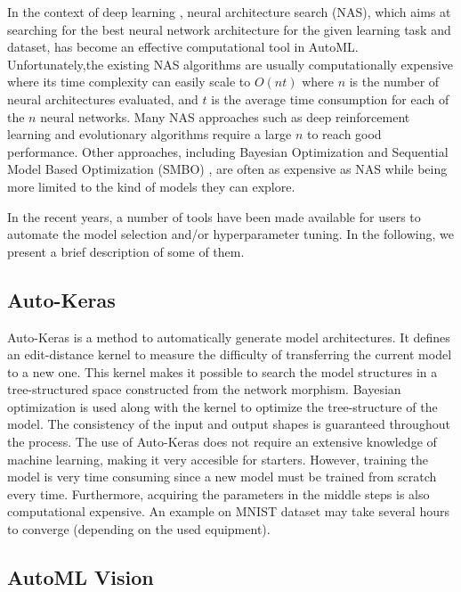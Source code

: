 \documentclass[12pt]{elsart}%
\begin{document}
In the context of deep learning , neural architecture search (NAS), which aims at searching for the best neural network architecture for the given learning task and dataset, has become an effective computational tool in AutoML. Unfortunately,the existing NAS algorithms are usually computationally expensive where its time complexity can easily scale to $O(nt)$ where $n$ is the number of neural architectures evaluated, and $t$ is the average time consumption for each of the $n$ neural networks. Many NAS approaches such as deep reinforcement learning  \cite{Zoph2016,Baker2016,Zhong2017} and evolutionary algorithms \cite{Liu2018,Liang2017,Angeline1994,Suganuma2017} require a large $n$ to reach good performance. Other approaches, including Bayesian Optimization \cite{Thornton2016,Brochu2010} and Sequential Model Based Optimization (SMBO) \cite{Hutter2011,Feurer2015}, are often as expensive as NAS while being more limited to the kind of models they can explore.


In the recent years, a number of tools have been made available for users to automate the model selection and/or hyperparameter tuning. In the following, we present a brief description of some of them.

\subsection{Auto-Keras}

Auto-Keras \cite{AutoKeras2018} is a method to automatically generate model architectures. It defines an edit-distance kernel to measure the difficulty of transferring the current model to a  new one. This kernel makes it possible to search the model structures in a tree-structured space constructed from the network morphism. Bayesian optimization is used along with the kernel to optimize the tree-structure of the model. The consistency of the input and output shapes is guaranteed throughout the process. The use of Auto-Keras does not require an extensive knowledge of machine learning, making it very accesible for starters. However, training the model is very time consuming since a new model must be trained from scratch every time. Furthermore,  acquiring the parameters in the middle steps is also computational expensive. An example on MNIST dataset may take several hours to converge (depending on the used equipment).

\subsection{AutoML Vision}
\end{document}
